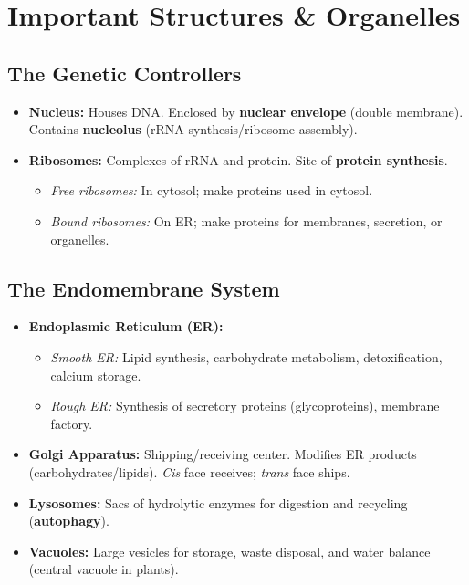 \documentclass[11pt, a4paper]{article}
\begin{document}
\section*{Important Structures \& Organelles}

\subsection*{The Genetic Controllers}
\begin{itemize}
    \item \textbf{Nucleus:} Houses DNA. Enclosed by \textbf{nuclear envelope} (double membrane). Contains \textbf{nucleolus} (rRNA synthesis/ribosome assembly).
    \item \textbf{Ribosomes:} Complexes of rRNA and protein. Site of \textbf{protein synthesis}.
    \begin{itemize}
        \item \textit{Free ribosomes:} In cytosol; make proteins used in cytosol.
        \item \textit{Bound ribosomes:} On ER; make proteins for membranes, secretion, or organelles.
    \end{itemize}
\end{itemize}

\subsection*{The Endomembrane System}
\begin{itemize}
    \item \textbf{Endoplasmic Reticulum (ER):}
    \begin{itemize}
        \item \textit{Smooth ER:} Lipid synthesis, carbohydrate metabolism, detoxification, calcium storage.
        \item \textit{Rough ER:} Synthesis of secretory proteins (glycoproteins), membrane factory.
    \end{itemize}
    \item \textbf{Golgi Apparatus:} Shipping/receiving center. Modifies ER products (carbohydrates/lipids). \textit{Cis} face receives; \textit{trans} face ships.
    \item \textbf{Lysosomes:} Sacs of hydrolytic enzymes for digestion and recycling (\textbf{autophagy}).
    \item \textbf{Vacuoles:} Large vesicles for storage, waste disposal, and water balance (central vacuole in plants).
\end{itemize}
\end{document}
